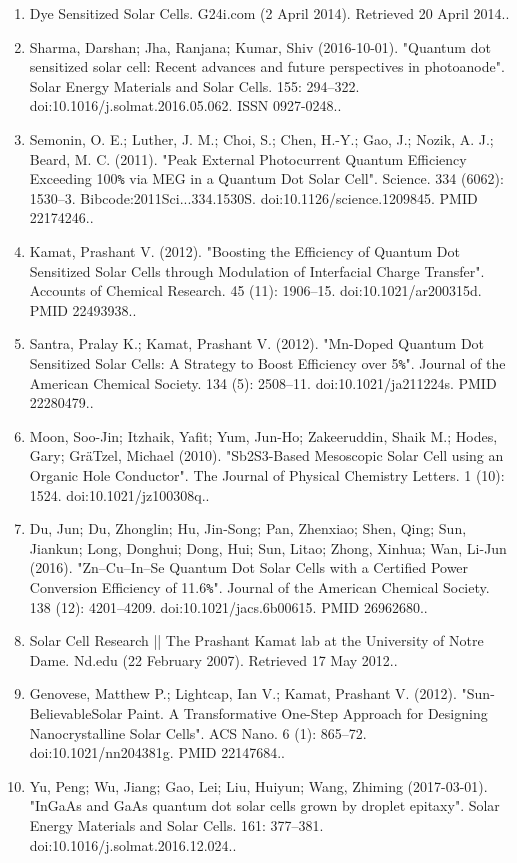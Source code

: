 \begin{enumerate}
\item Dye Sensitized Solar Cells. G24i.com (2 April 2014). Retrieved 20 April 2014..
\item Sharma, Darshan; Jha, Ranjana; Kumar, Shiv (2016-10-01). "Quantum dot sensitized solar cell: Recent advances and future perspectives in photoanode". Solar Energy Materials and Solar Cells. 155: 294–322. doi:10.1016/j.solmat.2016.05.062. ISSN 0927-0248..
\item Semonin, O. E.; Luther, J. M.; Choi, S.; Chen, H.-Y.; Gao, J.; Nozik, A. J.; Beard, M. C. (2011). "Peak External Photocurrent Quantum Efficiency Exceeding 100\verb`%` via MEG in a Quantum Dot Solar Cell". Science. 334 (6062): 1530–3. Bibcode:2011Sci...334.1530S. doi:10.1126/science.1209845. PMID 22174246..
\item Kamat, Prashant V. (2012). "Boosting the Efficiency of Quantum Dot Sensitized Solar Cells through Modulation of Interfacial Charge Transfer". Accounts of Chemical Research. 45 (11): 1906–15. doi:10.1021/ar200315d. PMID 22493938..
\item Santra, Pralay K.; Kamat, Prashant V. (2012). "Mn-Doped Quantum Dot Sensitized Solar Cells: A Strategy to Boost Efficiency over 5\verb`%`". Journal of the American Chemical Society. 134 (5): 2508–11. doi:10.1021/ja211224s. PMID 22280479..
\item Moon, Soo-Jin; Itzhaik, Yafit; Yum, Jun-Ho; Zakeeruddin, Shaik M.; Hodes, Gary; GräTzel, Michael (2010). "Sb2S3-Based Mesoscopic Solar Cell using an Organic Hole Conductor". The Journal of Physical Chemistry Letters. 1 (10): 1524. doi:10.1021/jz100308q..
\item Du, Jun; Du, Zhonglin; Hu, Jin-Song; Pan, Zhenxiao; Shen, Qing; Sun, Jiankun; Long, Donghui; Dong, Hui; Sun, Litao; Zhong, Xinhua; Wan, Li-Jun (2016). "Zn–Cu–In–Se Quantum Dot Solar Cells with a Certified Power Conversion Efficiency of 11.6\verb`%`". Journal of the American Chemical Society. 138 (12): 4201–4209. doi:10.1021/jacs.6b00615. PMID 26962680..
\item Solar Cell Research || The Prashant Kamat lab at the University of Notre Dame. Nd.edu (22 February 2007). Retrieved 17 May 2012..
\item Genovese, Matthew P.; Lightcap, Ian V.; Kamat, Prashant V. (2012). "Sun-BelievableSolar Paint. A Transformative One-Step Approach for Designing Nanocrystalline Solar Cells". ACS Nano. 6 (1): 865–72. doi:10.1021/nn204381g. PMID 22147684..
\item Yu, Peng; Wu, Jiang; Gao, Lei; Liu, Huiyun; Wang, Zhiming (2017-03-01). "InGaAs and GaAs quantum dot solar cells grown by droplet epitaxy". Solar Energy Materials and Solar Cells. 161: 377–381. doi:10.1016/j.solmat.2016.12.024..

\end{enumerate}
